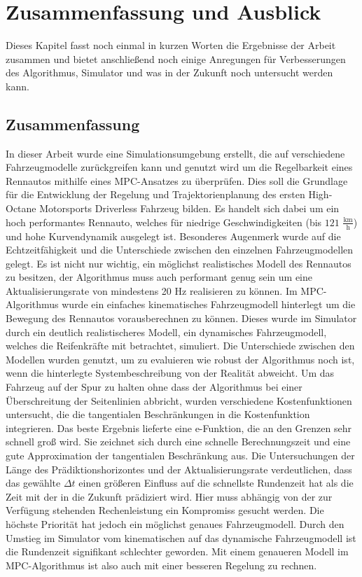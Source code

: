 \documentclass{like}
\begin{document}
\chapter[Zusammenfassung]{Zusammenfassung und Ausblick}
Dieses Kapitel fasst noch einmal in kurzen Worten die Ergebnisse der Arbeit zusammen und bietet anschließend noch einige Anregungen für Verbesserungen des Algorithmus, Simulator und was in der Zukunft noch untersucht werden kann.
\section{Zusammenfassung}
In dieser Arbeit wurde eine Simulationsumgebung erstellt, die auf verschiedene Fahrzeugmodelle zurückgreifen kann und genutzt wird um die Regelbarkeit eines Rennautos mithilfe eines \ac{MPC}-Ansatzes zu überprüfen. Dies soll die Grundlage für die Entwicklung der Regelung und Trajektorienplanung des ersten High-Octane Motorsports Driverless Fahrzeug bilden. Es handelt sich dabei um ein hoch performantes Rennauto, welches für niedrige Geschwindigkeiten (bis $121$ $\frac{\text{km}}{\text{h}}$) und hohe Kurvendynamik ausgelegt ist. Besonderes Augenmerk wurde auf die Echtzeitfähigkeit und die Unterschiede zwischen den einzelnen Fahrzeugmodellen gelegt. Es ist nicht nur wichtig, ein möglichst realistisches Modell des Rennautos zu besitzen, der Algorithmus muss auch performant genug sein um eine Aktualisierungsrate von mindestens 20 Hz realisieren zu können. 
Im \ac{MPC}-Algorithmus wurde ein einfaches kinematisches Fahrzeugmodell hinterlegt um die Bewegung des Rennautos vorausberechnen zu können. Dieses wurde im Simulator durch ein deutlich realistischeres Modell, ein dynamisches Fahrzeugmodell, welches die Reifenkräfte mit betrachtet, simuliert. Die Unterschiede zwischen den Modellen wurden genutzt, um zu evaluieren wie robust der Algorithmus noch ist, wenn die hinterlegte Systembeschreibung von der Realität abweicht. Um das Fahrzeug auf der Spur zu halten ohne dass der Algorithmus bei einer Überschreitung der Seitenlinien abbricht, wurden verschiedene Kostenfunktionen untersucht, die die tangentialen Beschränkungen in die Kostenfunktion integrieren. Das beste Ergebnis lieferte eine e-Funktion, die an den Grenzen sehr schnell groß wird. Sie zeichnet sich durch eine schnelle Berechnungszeit und eine gute Approximation der tangentialen Beschränkung aus. Die Untersuchungen der Länge des Prädiktionshorizontes und der Aktualisierungsrate verdeutlichen, dass das gewählte $\Delta t$ einen größeren Einfluss auf die schnellste Rundenzeit hat als die Zeit mit der in die Zukunft prädiziert wird. Hier muss abhängig von der zur Verfügung stehenden Rechenleistung ein Kompromiss gesucht werden. Die höchste Priorität hat jedoch ein möglichst genaues Fahrzeugmodell. Durch den Umstieg im Simulator vom kinematischen auf das dynamische Fahrzeugmodell ist die Rundenzeit signifikant schlechter geworden. Mit einem genaueren Modell im \ac{MPC}-Algorithmus ist also auch mit einer besseren Regelung zu rechnen.  
\end{document}
